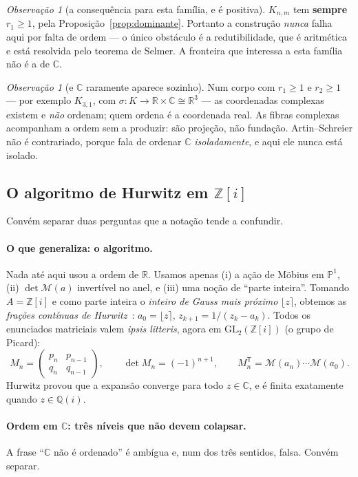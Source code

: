 \documentclass[11pt,a4paper]{article}
\theoremstyle{plain}
\theoremstyle{definition}
\theoremstyle{remark}
\newtheorem{obs}[teorema]{Observação}
\newcommand{\R}{\mathbb{R}}
\newcommand{\C}{\mathbb{C}}
\newcommand{\Q}{\mathbb{Q}}
\newcommand{\Z}{\mathbb{Z}}
\newcommand{\Pj}{\mathbb{P}^1}
\newcommand{\Mat}[1]{\mathcal{M}(#1)}
\newcommand{\GL}{\mathrm{GL}}
\begin{document}
\begin{obs}[a consequência para esta família, e é positiva]
$K_{n,m}$ tem \textbf{sempre} $r_1\geq1$, pela Proposição~\ref{prop:dominante}. Portanto a
construção \emph{nunca} falha aqui por falta de ordem --- o único obstáculo é a redutibilidade, que
é aritmética e está resolvida pelo teorema de Selmer. A fronteira que interessa a esta família não
é a de $\C$.
\end{obs}

\begin{obs}[e $\C$ raramente aparece sozinho]
Num corpo com $r_1\geq1$ e $r_2\geq1$ --- por exemplo $K_{3,1}$, com
$\sigma\colon K \to \R\times\C \cong \R^3$ --- as coordenadas complexas existem e \emph{não}
ordenam; quem ordena é a coordenada real. As fibras complexas acompanham a ordem sem a produzir:
são projeção, não fundação. Artin--Schreier não é contrariado, porque fala de ordenar $\C$
\emph{isoladamente}, e aqui ele nunca está isolado.
\end{obs}

\subsection{O algoritmo de Hurwitz em $\Z[i]$}

Convém separar duas perguntas que a notação tende a confundir.

\paragraph{O que generaliza: o algoritmo.} Nada até aqui usou a ordem de $\R$. Usamos
apenas (i) a ação de Möbius em $\Pj$, (ii) $\det\Mat{a}$ invertível no anel, e (iii) uma noção
de ``parte inteira''. Tomando $A = \Z[i]$ e como parte inteira o \emph{inteiro de Gauss mais
próximo} $\lfloor z \rceil$, obtemos as \emph{frações contínuas de Hurwitz}~\cite{hurwitz1887}: $a_0 = \lfloor
z\rceil$, $z_{k+1} = 1/(z_k - a_k)$. Todos os enunciados matriciais valem \emph{ipsis litteris},
agora em $\GL_2(\Z[i])$ (o grupo de Picard):
\[
  M_n = \begin{pmatrix} p_n & p_{n-1}\\ q_n & q_{n-1}\end{pmatrix}, \qquad
  \det M_n = (-1)^{n+1}, \qquad
  M_n^{\mathsf T} = \Mat{a_n}\cdots\Mat{a_0}.
\]
Hurwitz provou que a expansão converge para todo $z\in\C$, e é finita exatamente quando
$z \in \Q(i)$.

\paragraph{Ordem em $\C$: três níveis que não devem colapsar.} A frase ``$\C$ não é ordenado''
é ambígua e, num dos três sentidos, falsa. Convém separar.
\end{document}
